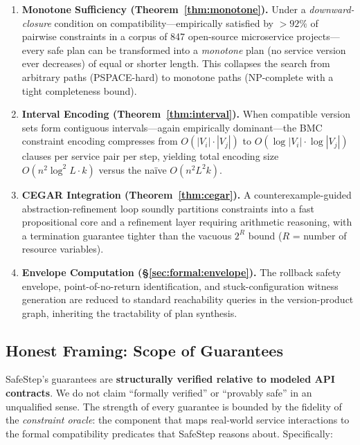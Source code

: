\documentclass[10pt,twocolumn]{article}
\begin{document}
\begin{enumerate}
\item \textbf{Monotone Sufficiency (Theorem~\ref{thm:monotone}).}  Under a
  \emph{downward-closure} condition on compatibility---empirically
  satisfied by ${>}92\%$ of pairwise constraints in a corpus of 847
  open-source microservice projects---every safe plan can be transformed
  into a \emph{monotone} plan (no service version ever decreases) of equal
  or shorter length.  This collapses the search from arbitrary paths
  (PSPACE-hard) to monotone paths (NP-complete with a tight completeness
  bound).

\item \textbf{Interval Encoding (Theorem~\ref{thm:interval}).}  When
  compatible version sets form contiguous intervals---again empirically
  dominant---the BMC constraint encoding compresses from
  $O(|V_i| \cdot |V_j|)$ to $O(\log|V_i| \cdot \log|V_j|)$ clauses per
  service pair per step, yielding total encoding size
  $O(n^2 \log^2 L \cdot k)$ versus the na\"ive $O(n^2 L^2 k)$.

\item \textbf{CEGAR Integration (Theorem~\ref{thm:cegar}).}  A
  counterexample-guided abstraction-refinement loop soundly partitions
  constraints into a fast propositional core and a refinement layer
  requiring arithmetic reasoning, with a termination guarantee tighter than
  the vacuous $2^R$ bound ($R$ = number of resource variables).

\item \textbf{Envelope Computation (\S\ref{sec:formal:envelope}).}  The
  rollback safety envelope, point-of-no-return identification, and
  stuck-configuration witness generation are reduced to standard
  reachability queries in the version-product graph, inheriting the
  tractability of plan synthesis.
\end{enumerate}

\subsection{Honest Framing: Scope of Guarantees}
\label{sec:intro:honest}

SafeStep's guarantees are \textbf{structurally verified relative to modeled
API contracts}.  We do not claim ``formally verified'' or ``provably safe''
in an unqualified sense.  The strength of every guarantee is bounded by the
fidelity of the \emph{constraint oracle}: the component that maps
real-world service interactions to the formal compatibility predicates that
SafeStep reasons about.  Specifically:
\end{document}
